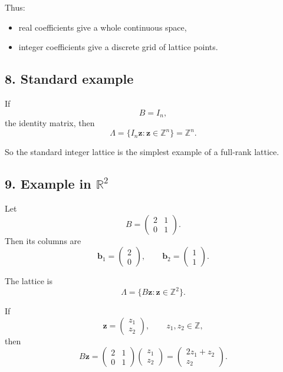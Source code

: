 \documentclass[12pt]{article}
\begin{document}
	Thus:
	\begin{itemize}
		\item real coefficients give a whole continuous space,
		\item integer coefficients give a discrete grid of lattice points.
	\end{itemize}
	
	\subsection*{8. Standard example}
	
	If
	\[
	B=I_n,
	\]
	the identity matrix, then
	\[
	\Lambda=\{I_n\mathbf{z}:\mathbf{z}\in\mathbb{Z}^n\}=\mathbb{Z}^n.
	\]
	
	So the standard integer lattice is the simplest example of a full-rank lattice.
	
	\subsection*{9. Example in \(\mathbb{R}^2\)}
	
	Let
	\[
	B=
	\begin{pmatrix}
		2 & 1\\
		0 & 1
	\end{pmatrix}.
	\]
	Then its columns are
	\[
	\mathbf{b}_1=
	\begin{pmatrix}
		2\\
		0
	\end{pmatrix},
	\qquad
	\mathbf{b}_2=
	\begin{pmatrix}
		1\\
		1
	\end{pmatrix}.
	\]
	
	The lattice is
	\[
	\Lambda
	=
	\{B\mathbf{z}:\mathbf{z}\in\mathbb{Z}^2\}.
	\]
	
	If
	\[
	\mathbf{z}=
	\begin{pmatrix}
		z_1\\
		z_2
	\end{pmatrix},
	\qquad z_1,z_2\in\mathbb{Z},
	\]
	then
	\[
	B\mathbf{z}
	=
	\begin{pmatrix}
		2 & 1\\
		0 & 1
	\end{pmatrix}
	\begin{pmatrix}
		z_1\\
		z_2
	\end{pmatrix}
	=
	\begin{pmatrix}
		2z_1+z_2\\
		z_2
	\end{pmatrix}.
	\]
	
\end{document}
